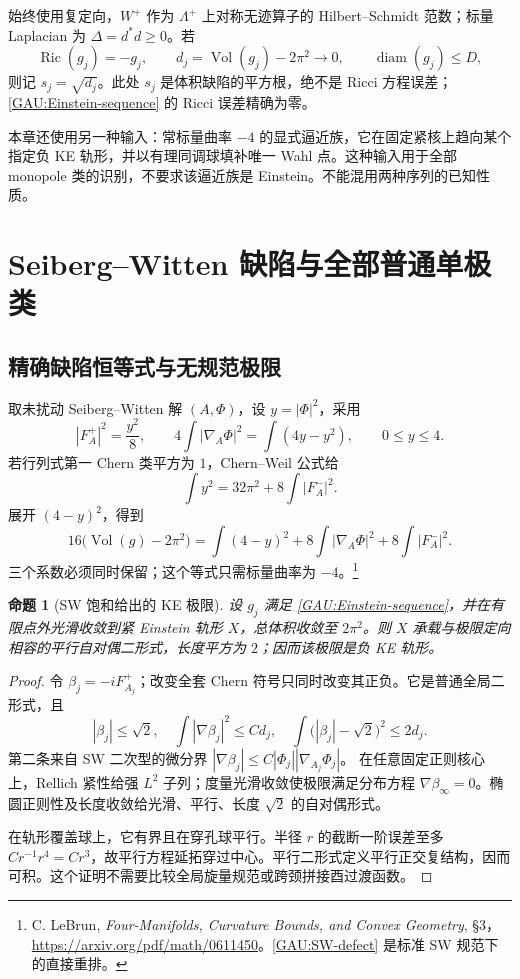 \documentclass[UTF8,fontset=fandol,zihao=-4,oneside,openany]{ctexbook}
\theoremstyle{cjkplain}
\newtheorem{proposition}[theorem]{命题}
\numberwithin{equation}{chapter}
\begin{document}
始终使用复定向，$W^+$ 作为 $\Lambda^+$ 上对称无迹算子的 Hilbert--Schmidt 范数；标量 Laplacian 为 $\Delta=d^*d\ge0$。若
\begin{equation}\label{GAU:Einstein-sequence}
\operatorname{Ric}(g_j)=-g_j,\qquad
 d_j=\operatorname{Vol}(g_j)-2\pi^2\longrightarrow0,
 \qquad \operatorname{diam}(g_j)\le D,
\end{equation}
则记 $s_j=\sqrt{d_j}$。此处 $s_j$ 是体积缺陷的平方根，绝不是 Ricci 方程误差；\eqref{GAU:Einstein-sequence} 的 Ricci 误差精确为零。

本章还使用另一种输入：常标量曲率 $-4$ 的显式逼近族，它在固定紧核上趋向某个指定负 KE 轨形，并以有理同调球填补唯一 Wahl 点。这种输入用于全部 monopole 类的识别，不要求该逼近族是 Einstein。不能混用两种序列的已知性质。

\section{Seiberg--Witten 缺陷与全部普通单极类}
\label{GAU:SW}

\subsection{精确缺陷恒等式与无规范极限}
取未扰动 Seiberg--Witten 解 $(A,\Phi)$，设 $y=|\Phi|^2$，采用
\begin{equation}\label{GAU:SW-normalization}
|F_A^+|^2=\frac{y^2}{8},\qquad
4\int|\nabla_A\Phi|^2=\int(4y-y^2),\qquad 0\le y\le4.
\end{equation}
若行列式第一 Chern 类平方为 $1$，Chern--Weil 公式给
\[
\int y^2=32\pi^2+8\int|F_A^-|^2.
\]
展开 $(4-y)^2$，得到
\begin{equation}\label{GAU:SW-defect}
\boxed{16\bigl(\operatorname{Vol}(g)-2\pi^2\bigr)
=\int(4-y)^2+8\int|\nabla_A\Phi|^2+8\int|F_A^-|^2.}
\end{equation}
三个系数必须同时保留；这个等式只需标量曲率为 $-4$。\footnote{C. LeBrun, \emph{Four-Manifolds, Curvature Bounds, and Convex Geometry}, §3，\url{https://arxiv.org/pdf/math/0611450}。\eqref{GAU:SW-defect} 是标准 SW 规范下的直接重排。}

\begin{proposition}[SW 饱和给出的 KE 极限]\label{GAU:SW-to-KE}
设 $g_j$ 满足 \eqref{GAU:Einstein-sequence}，并在有限点外光滑收敛到紧 Einstein 轨形 $X$，总体积收敛至 $2\pi^2$。则 $X$ 承载与极限定向相容的平行自对偶二形式，长度平方为 $2$；因而该极限是负 KE 轨形。
\end{proposition}
\begin{proof}
令 $\beta_j=-iF_{A_j}^+$；改变全套 Chern 符号只同时改变其正负。它是普通全局二形式，且
\[
|\beta_j|\le\sqrt2,\quad
\int|\nabla\beta_j|^2\le C d_j,\quad
\int\bigl(|\beta_j|-\sqrt2\bigr)^2\le2d_j.
\]
第二条来自 SW 二次型的微分界
$|\nabla\beta_j|\le C|\Phi_j||\nabla_{A_j}\Phi_j|$。
在任意固定正则核心上，Rellich 紧性给强 $L^2$ 子列；度量光滑收敛使极限满足分布方程 $\nabla\beta_\infty=0$。椭圆正则性及长度收敛给光滑、平行、长度 $\sqrt2$ 的自对偶形式。

在轨形覆盖球上，它有界且在穿孔球平行。半径 $r$ 的截断一阶误差至多 $Cr^{-1}r^4=Cr^3$，故平行方程延拓穿过中心。平行二形式定义平行正交复结构，因而可积。这个证明不需要比较全局旋量规范或跨颈拼接酉过渡函数。
\end{proof}
\end{document}
